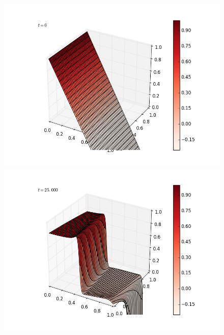 \documentclass[12pt]{article}
\begin{document}
\begin{figure}[H]
\includegraphics[scale=0.4]{partc_fast_frames/partc_fast_fig01.png}
\includegraphics[scale=0.4]{partc_fast_frames/partc_fast_fig03.png}
\end{figure}
\end{document}
